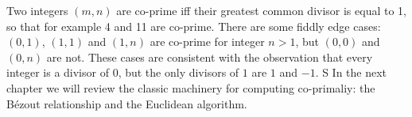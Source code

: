 \label{sec:coprime}
Two integers $(m,n)$ are co-prime iff%
their greatest common divisor is equal to 1, so that for example 4 and 11 are co-prime. There are some fiddly edge cases:  $(0,1)$, $(1,1)$ and $(1,n)$ are co-prime for integer $n>1$, but $(0,0)$ and $(0,n)$ are not. These cases are consistent with the observation that  every integer is a divisor of $0$, but the only divisors of $1$ are $1$ and $-1$. S In the next chapter we will review the classic machinery for computing co-primaliy:  the B{\'e}zout relationship and the Euclidean algorithm. 
% 
